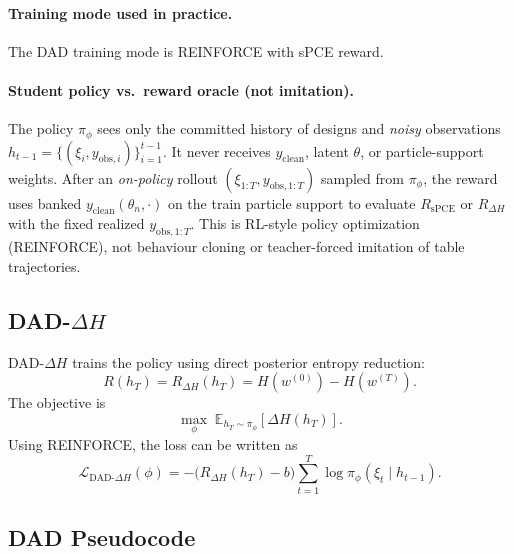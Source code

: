 \documentclass[11pt]{article}
\begin{document}
\paragraph{Training mode used in practice.}
The DAD training mode is REINFORCE with sPCE reward.

\paragraph{Student policy vs.\ reward oracle (not imitation).}
The policy $\pi_\phi$ sees only the committed history of designs and \emph{noisy} observations $h_{t-1}=\{(\xi_i,y_{\mathrm{obs},i})\}_{i=1}^{t-1}$.
It never receives $y_{\mathrm{clean}}$, latent $\theta$, or particle-support weights.
After an \emph{on-policy} rollout $(\xi_{1:T},y_{\mathrm{obs},1:T})$ sampled from $\pi_\phi$, the reward uses banked $y_{\mathrm{clean}}(\theta_n,\cdot)$ on the train particle support to evaluate $R_{\mathrm{sPCE}}$ or $R_{\Delta H}$ with the fixed realized $y_{\mathrm{obs},1:T}$.
This is RL-style policy optimization (REINFORCE), not behaviour cloning or teacher-forced imitation of table trajectories.

\subsection{DAD-$\Delta H$}

DAD-$\Delta H$ trains the policy using direct posterior entropy reduction:
\begin{equation}
 R(h_T)=R_{\Delta H}(h_T)=H(w^{(0)})-H(w^{(T)}).
\end{equation}
The objective is
\begin{equation}
 \max_\phi\;\mathbb{E}_{h_T\sim \pi_\phi}[\Delta H(h_T)].
\end{equation}
Using REINFORCE, the loss can be written as
\begin{equation}
 \mathcal{L}_{\mathrm{DAD}\mbox{-}\Delta H}(\phi)
 =
 -\big(R_{\Delta H}(h_T)-b\big)
 \sum_{t=1}^{T}
 \log \pi_\phi(\xi_t\mid h_{t-1}).
\end{equation}

\subsection{DAD Pseudocode}
\end{document}
